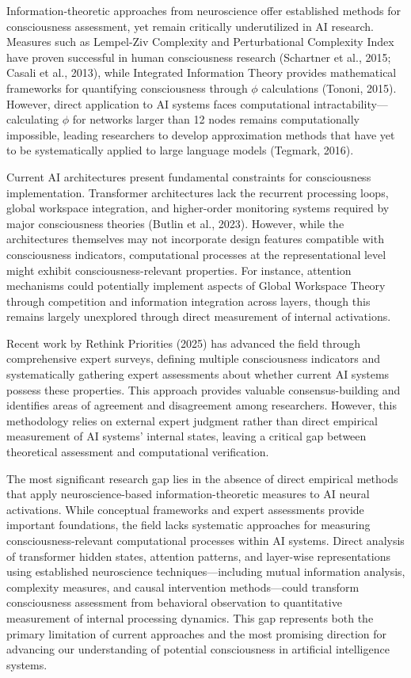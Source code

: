 \documentclass[11pt,a4paper]{article}
\begin{document}
Information-theoretic approaches from neuroscience offer established methods for consciousness assessment, yet remain critically underutilized in AI research. Measures such as Lempel-Ziv Complexity and Perturbational Complexity Index have proven successful in human consciousness research (Schartner et al., 2015; Casali et al., 2013), while Integrated Information Theory provides mathematical frameworks for quantifying consciousness through $\phi$ calculations (Tononi, 2015). However, direct application to AI systems faces computational intractability—calculating $\phi$ for networks larger than 12 nodes remains computationally impossible, leading researchers to develop approximation methods that have yet to be systematically applied to large language models (Tegmark, 2016).

Current AI architectures present fundamental constraints for consciousness implementation. Transformer architectures lack the recurrent processing loops, global workspace integration, and higher-order monitoring systems required by major consciousness theories (Butlin et al., 2023). However, while the architectures themselves may not incorporate design features compatible with consciousness indicators, computational processes at the representational level might exhibit consciousness-relevant properties. For instance, attention mechanisms could potentially implement aspects of Global Workspace Theory through competition and information integration across layers, though this remains largely unexplored through direct measurement of internal activations.

Recent work by Rethink Priorities (2025) has advanced the field through comprehensive expert surveys, defining multiple consciousness indicators and systematically gathering expert assessments about whether current AI systems possess these properties. This approach provides valuable consensus-building and identifies areas of agreement and disagreement among researchers. However, this methodology relies on external expert judgment rather than direct empirical measurement of AI systems' internal states, leaving a critical gap between theoretical assessment and computational verification.

The most significant research gap lies in the absence of direct empirical methods that apply neuroscience-based information-theoretic measures to AI neural activations. While conceptual frameworks and expert assessments provide important foundations, the field lacks systematic approaches for measuring consciousness-relevant computational processes within AI systems. Direct analysis of transformer hidden states, attention patterns, and layer-wise representations using established neuroscience techniques—including mutual information analysis, complexity measures, and causal intervention methods—could transform consciousness assessment from behavioral observation to quantitative measurement of internal processing dynamics. This gap represents both the primary limitation of current approaches and the most promising direction for advancing our understanding of potential consciousness in artificial intelligence systems.
\end{document}
